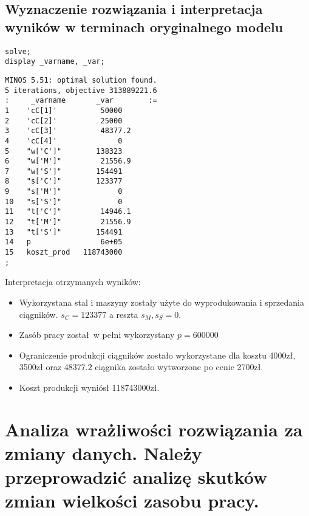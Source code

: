 \documentclass{article}
\begin{document}
\subsection{Wyznaczenie rozwiązania i interpretacja wyników w terminach oryginalnego modelu}

\lstset{language=BASH}
\begin{lstlisting}[caption={Komendy uruchamiające solver MINOS na stronie https://ampl.com/cgi-bin/ampl/amplcgi},label=DescriptiveLabel]
solve;
display _varname, _var;
\end{lstlisting}

\lstset{language=BASH}
\begin{lstlisting}[caption={Wynik solwera},label=DescriptiveLabel]
MINOS 5.51: optimal solution found.
5 iterations, objective 313889221.6
:     _varname       _var        :=
1    'cC[1]'          50000
2    'cC[2]'          25000
3    'cC[3]'          48377.2
4    'cC[4]'              0
5    "w['C']"        138323
6    "w['M']"         21556.9
7    "w['S']"        154491
8    "s['C']"        123377
9    "s['M']"             0
10   "s['S']"             0
11   "t['C']"         14946.1
12   "t['M']"         21556.9
13   "t['S']"        154491
14   p                6e+05
15   koszt_prod   118743000
;
\end{lstlisting}

Interpretacja otrzymanych wyników:

\begin{itemize}
  \item Wykorzystana stal i maszyny zostały użyte do wyprodukowania i sprzedania ciągników. $s_C = 123377$ a reszta $s_M , s_S = 0$.
  \item Zasób pracy został w pełni wykorzystany $p = 600000$
  \item Ograniczenie produkcji ciągników zostało wykorzystane dla kosztu 4000zł, 3500zł oraz $48377.2$ ciągnika zostało wytworzone po cenie 2700zł.
  \item Koszt produkcji wyniósł 118743000zł.
\end{itemize}

\section{Analiza wrażliwości rozwiązania za zmiany danych. Należy przeprowadzić analizę skutków zmian wielkości zasobu pracy.}
\end{document}
